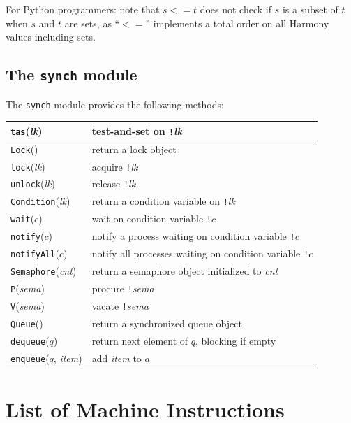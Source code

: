 \documentclass{report}
\begin{document}
\vspace{1em}
For Python programmers: note that $s <= t$ does not check if $s$ is a subset of
$t$ when $s$ and $t$ are sets, as ``$<=$'' implements a total order on all Harmony values
including sets.

\section{The \texttt{synch} module}

%
The \texttt{synch} module provides the following methods:

\vspace{1em}
\begin{tabular}{|l|l|}
\hline
\texttt{tas}(\textit{lk}) & test-and-set on \texttt{!}\textit{lk} \\
\hline
\texttt{Lock}() & return a lock object \\
\hline
\texttt{lock}(\textit{lk}) & acquire \texttt{!}\textit{lk} \\
\hline
\texttt{unlock}(\textit{lk}) & release \texttt{!}\textit{lk} \\
\hline
\texttt{Condition}(\textit{lk}) & return a condition variable on \texttt{!}\textit{lk} \\
\hline
\texttt{wait}($c$) & wait on condition variable \texttt{!}$c$ \\
\hline
\texttt{notify}($c$) & notify a process waiting on condition variable \texttt{!}$c$ \\
\hline
\texttt{notifyAll}($c$) & notify all processes waiting on condition variable \texttt{!}$c$ \\
\hline
\texttt{Semaphore}(\textit{cnt}) & return a semaphore object initialized to \textit{cnt} \\
\hline
\texttt{P}(\textit{sema}) & procure \texttt{!}\textit{sema}  \\
\hline
\texttt{V}(\textit{sema}) & vacate \texttt{!}\textit{sema}  \\
\hline
\texttt{Queue}() & return a synchronized queue object \\
\hline
\texttt{dequeue}($q$) & return next element of $q$, blocking if empty \\
\hline
\texttt{enqueue}($q$, \textit{item}) & add \textit{item} to $a$ \\
\hline
\end{tabular}

\chapter{List of Machine Instructions}
\label{ap:harmonybytecode}
\end{document}
